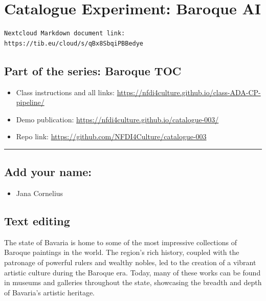 \documentclass[
  letterpaper,
]{book}
\providecommand{\tightlist}{%
  \setlength{\itemsep}{0pt}\setlength{\parskip}{0pt}}\usepackage{longtable,booktabs,array}
\begin{document}

\hypertarget{catalogue-experiment-baroque-ai}{%
\chapter{Catalogue Experiment: Baroque
AI}\label{catalogue-experiment-baroque-ai}}

\begin{verbatim}
Nextcloud Markdown document link: https://tib.eu/cloud/s/qBx8SbqiPBBedye 
\end{verbatim}

\hypertarget{part-of-the-series-baroque-toc-1}{%
\section{Part of the series: Baroque
TOC}\label{part-of-the-series-baroque-toc-1}}

\begin{itemize}
\tightlist
\item
  Class instructions and all links:
  \url{https://nfdi4culture.github.io/class-ADA-CP-pipeline/}
\item
  Demo publication: \url{https://nfdi4culture.github.io/catalogue-003/}
\item
  Repo link: \url{https://github.com/NFDI4Culture/catalogue-003}
\end{itemize}

\begin{center}\rule{0.5\linewidth}{0.5pt}\end{center}

\hypertarget{add-your-name}{%
\section{Add your name:}\label{add-your-name}}

\begin{itemize}
\tightlist
\item
  Jana Cornelius
\end{itemize}

\hypertarget{text-editing}{%
\section{Text editing}\label{text-editing}}

The state of Bavaria is home to some of the most impressive collections
of Baroque paintings in the world. The region's rich history, coupled
with the patronage of powerful rulers and wealthy nobles, led to the
creation of a vibrant artistic culture during the Baroque era. Today,
many of these works can be found in museums and galleries throughout the
state, showcasing the breadth and depth of Bavaria's artistic heritage.
\end{document}
